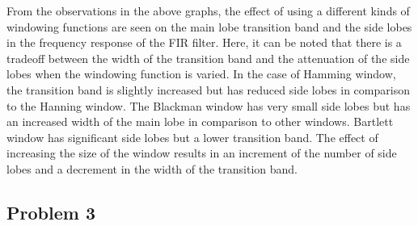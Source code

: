 \documentclass[a4paper,11pt]{article}
\begin{document}
From the observations in the above graphs, the effect of using a different kinds of windowing
functions are seen on the main lobe transition band and the side lobes in the frequency
response of the FIR filter. Here, it can be noted that there is a tradeoff between the width of
the transition band and the attenuation of the side lobes when the windowing function is
varied. In the case of Hamming window, the transition band is slightly increased but has
reduced side lobes in comparison to the Hanning window. The Blackman window has very
small side lobes but has an increased width of the main lobe in comparison to other windows.
Bartlett window has significant side lobes but a lower transition band. The effect of increasing
the size of the window results in an increment of the number of side lobes and a decrement in
the width of the transition band.


\subsection{Problem 3}
\end{document}
